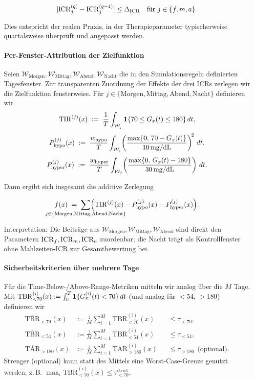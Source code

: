 \[
|\mathrm{ICR}_j^{(q)} - \mathrm{ICR}_j^{(q-1)}| \le \Delta_{\mathrm{ICR}} \quad \text{für } j \in \{f,m,a\}.
\]

Dies entspricht der realen Praxis, in der Therapieparameter typischerweise quartalsweise überprüft und angepasst werden.

\paragraph{Per-Fenster-Attribution der Zielfunktion}
Seien \(\mathcal W_{\mathrm{Morgen}}, \mathcal W_{\mathrm{Mittag}}, \mathcal W_{\mathrm{Abend}}, \mathcal W_{\mathrm{Nacht}}\) die in den Simulationsregeln definierten Tagesfenster. Zur transparenten Zuordnung der Effekte der drei ICRs zerlegen wir die Zielfunktion fensterweise. Für \(j\in\{\mathrm{Morgen},\mathrm{Mittag},\mathrm{Abend},\mathrm{Nacht}\}\) definieren wir
\[
\mathrm{TIR}^{(j)}(x)\;:=\;\frac{1}{T}\int_{\mathcal W_j} \mathbf{1}\{70\le G_x(t)\le 180\}\,dt,
\]
\[
P_{\mathrm{hypo}}^{(j)}(x)\;:=\;\frac{w_{\mathrm{hypo}}}{T}\int_{\mathcal W_j}\!\left(\frac{\max\{0,\,70-G_x(t)\}}{10\,\mathrm{mg/dL}}\right)^{\!2}\, dt.
\]
\[
P_{\mathrm{hyper}}^{(j)}(x)\;:=\;\frac{w_{\mathrm{hyper}}}{T}\int_{\mathcal W_j}\!\left(\frac{\max\{0,\,G_x(t)-180\}}{30\,\mathrm{mg/dL}}\right)\, dt.
\]
\medskip

\noindent Dann ergibt sich insgesamt die additive Zerlegung

\newcommand{\Jfen}{\{\mathrm{Morgen},\mathrm{Mittag},\mathrm{Abend},\mathrm{Nacht}\}}
\[
f(x) \;=\; \sum_{\mathclap{j\in\Jfen}}\Bigl(\mathrm{TIR}^{(j)}(x) - P_{\mathrm{hypo}}^{(j)}(x) - P_{\mathrm{hyper}}^{(j)}(x)\Bigr).
\]
\medskip

\noindent Interpretation: Die Beiträge aus \(\mathcal W_{\mathrm{Morgen}},\mathcal W_{\mathrm{Mittag}},\mathcal W_{\mathrm{Abend}}\) sind direkt den Parametern \(\mathrm{ICR}_f,\mathrm{ICR}_m,\mathrm{ICR}_a\) zuordenbar; die Nacht trägt als Kontrollfenster ohne Mahlzeiten-ICR zur Gesamtbewertung bei.
\medskip

\paragraph{Sicherheitskriterien über mehrere Tage}
Für die Time-Below-/Above-Range-Metriken mitteln wir analog über die \(M\) Tage. Mit \(\mathrm{TBR}^{(i)}_{<70}(x):=\int_0^T \mathbf{1}\{G^{(i)}_x(t)<70\}\,dt\) (und analog für \(<54\), \(>180\)) definieren wir
\begin{align}
\overline{\mathrm{TBR}}_{<70}(x)  &:= \frac{1}{M}\sum_{i=1}^M \mathrm{TBR}^{(i)}_{<70}(x)  &&\le \tau_{<70},\\
\overline{\mathrm{TBR}}_{<54}(x)  &:= \frac{1}{M}\sum_{i=1}^M \mathrm{TBR}^{(i)}_{<54}(x)  &&\le \tau_{<54},\\
\overline{\mathrm{TAR}}_{>180}(x) &:= \frac{1}{M}\sum_{i=1}^M \mathrm{TAR}^{(i)}_{>180}(x) &&\le \tau_{>180}\ \ \text{(optional)}.
\end{align}
\noindent Strenger (optional) kann statt des Mittels eine Worst-Case-Grenze genutzt werden, z.\,B. \(\max_i \mathrm{TBR}^{(i)}_{<70}(x)\le\tau_{<70}^{\text{strict}}\).


